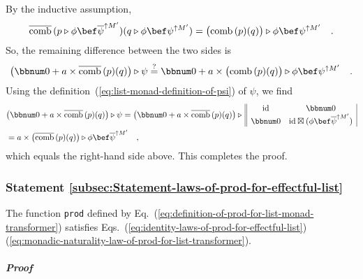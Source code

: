 By the inductive assumption,
\[
\overline{\text{comb}}\,(p\triangleright\phi\bef\overline{\psi}^{\uparrow M^{\prime}})(q\triangleright\phi\bef\psi^{\uparrow M^{\prime}})=\big(\text{comb}\,(p)(q)\big)\triangleright\phi\bef\psi^{\uparrow M^{\prime}}\quad.
\]
So, the remaining difference between the two sides is
\[
\big(\bbnum 0+a\times\overline{\text{comb}}\,(p)(q)\big)\triangleright\psi\overset{?}{=}\bbnum 0+a\times\big(\text{comb}\,(p)(q)\big)\triangleright\phi\bef\psi^{\uparrow M^{\prime}}\quad.
\]
Using the definition~(\ref{eq:list-monad-definition-of-psi}) of
$\psi$, we find
\begin{align*}
 & \big(\bbnum 0+a\times\overline{\text{comb}}\,(p)(q)\big)\triangleright\psi=\big(\bbnum 0+a\times\overline{\text{comb}}\,(p)(q)\big)\triangleright\,\begin{array}{||cc|}
\text{id} & \bbnum 0\\
\bbnum 0 & \text{id}\boxtimes(\phi\bef\overline{\psi}^{\uparrow M^{\prime}})
\end{array}\\
 & =a\times\big(\overline{\text{comb}}\,(p)(q)\big)\triangleright\phi\bef\overline{\psi}^{\uparrow M^{\prime}}\quad,
\end{align*}
which equals the right-hand side above. This completes the proof.

\subsubsection{Statement \label{subsec:Statement-laws-of-prod-for-effectful-list}\ref{subsec:Statement-laws-of-prod-for-effectful-list}}

The function \lstinline!prod! defined by Eq.~(\ref{eq:definition-of-prod-for-list-monad-transformer})
satisfies Eqs.~(\ref{eq:identity-laws-of-prod-for-effectful-list})\textendash (\ref{eq:monadic-naturality-law-of-prod-for-list-transformer}).

\subparagraph{Proof}

